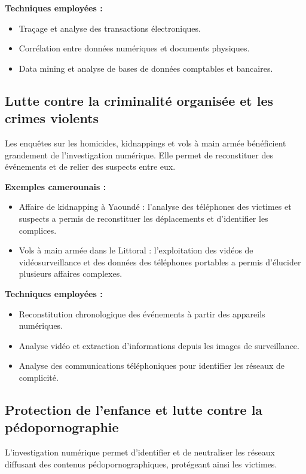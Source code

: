 \documentclass[12pt,a4paper]{article}
\begin{document}
\textbf{Techniques employées :}
\begin{itemize}[leftmargin=*]
    \item Traçage et analyse des transactions électroniques.
    \item Corrélation entre données numériques et documents physiques.
    \item Data mining et analyse de bases de données comptables et bancaires.
\end{itemize}

\subsection{Lutte contre la criminalité organisée et les crimes violents}

Les enquêtes sur les homicides, kidnappings et vols à main armée bénéficient grandement de l'investigation numérique. Elle permet de reconstituer des événements et de relier des suspects entre eux.

\textbf{Exemples camerounais :}
\begin{itemize}[leftmargin=*]
    \item Affaire de kidnapping à Yaoundé : l'analyse des téléphones des victimes et suspects a permis de reconstituer les déplacements et d'identifier les complices.
    \item Vols à main armée dans le Littoral : l'exploitation des vidéos de vidéosurveillance et des données des téléphones portables a permis d'élucider plusieurs affaires complexes.
\end{itemize}

\textbf{Techniques employées :}
\begin{itemize}[leftmargin=*]
    \item Reconstitution chronologique des événements à partir des appareils numériques.
    \item Analyse vidéo et extraction d'informations depuis les images de surveillance.
    \item Analyse des communications téléphoniques pour identifier les réseaux de complicité.
\end{itemize}

\subsection{Protection de l'enfance et lutte contre la pédopornographie}

L'investigation numérique permet d'identifier et de neutraliser les réseaux diffusant des contenus pédopornographiques, protégeant ainsi les victimes.
\end{document}
